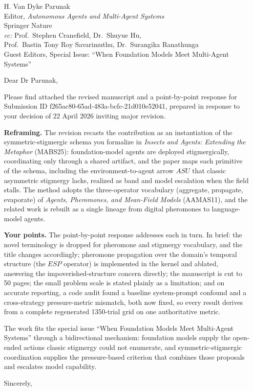 \documentclass[11pt]{letter}
\begin{document}
\begin{letter}{H. Van Dyke Parunak\\
Editor, \emph{Autonomous Agents and Multi-Agent Systems}\\
Springer Nature\\[0.3em]
\emph{cc:} Prof.\ Stephen Cranefield, Dr.\ Shuyue Hu,\\
Prof.\ Bastin Tony Roy Savarimuthu, Dr.\ Surangika Ranathunga\\
Guest Editors, Special Issue: ``When Foundation Models Meet Multi-Agent Systems''}

\opening{Dear Dr Parunak,}

Please find attached the revised manuscript and a point-by-point response for Submission ID f265ac80-65ad-483a-bcfc-21d010e52041, prepared in response to your decision of 22 April 2026 inviting major revision.

\textbf{Reframing.}
The revision recasts the contribution as an instantiation of the symmetric-stigmergic schema you formalize in \emph{Insects and Agents: Extending the Metaphor} (MABS25): foundation-model agents are deployed stigmergically, coordinating only through a shared artifact, and the paper maps each primitive of the schema, including the environment-to-agent arrow $ASU$ that classic asymmetric stigmergy lacks, realized as band and model escalation when the field stalls. The method adopts the three-operator vocabulary (aggregate, propagate, evaporate) of \emph{Agents, Pheromones, and Mean-Field Models} (AAMAS11), and the related work is rebuilt as a single lineage from digital pheromones to language-model agents.

\textbf{Your points.}
The point-by-point response addresses each in turn. In brief: the novel terminology is dropped for pheromone and stigmergy vocabulary, and the title changes accordingly; pheromone propagation over the domain's temporal structure (the $ESP$ operator) is implemented in the kernel and ablated, answering the impoverished-structure concern directly; the manuscript is cut to 50 pages; the small problem scale is stated plainly as a limitation; and on accurate reporting, a code audit found a baseline system-prompt confound and a cross-strategy pressure-metric mismatch, both now fixed, so every result derives from a complete regenerated 1350-trial grid on one authoritative metric.

The work fits the special issue ``When Foundation Models Meet Multi-Agent Systems'' through a bidirectional mechanism: foundation models supply the open-ended actions classic stigmergy could not enumerate, and symmetric-stigmergic coordination supplies the pressure-based criterion that combines those proposals and escalates model capability.

\closing{Sincerely,}

\end{letter}
\end{document}
